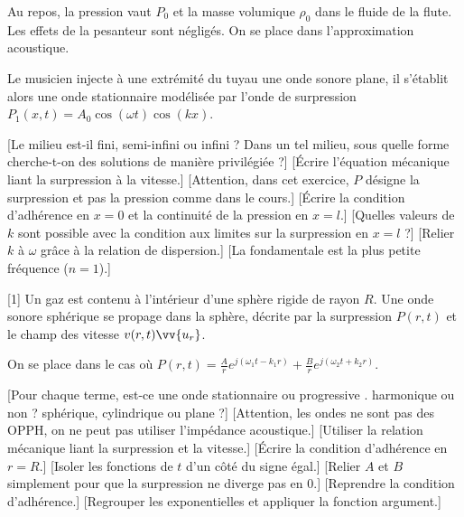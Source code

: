 Au repos, la pression vaut $P_0$ et la masse volumique $\rho_0$ dans le fluide de la flute. Les effets de la pesanteur sont négligés. On se place dans l'approximation acoustique.

Le musicien injecte à une extrémité du tuyau une onde sonore plane, il s'établit alors une onde stationnaire modélisée par l'onde de surpression $P_1(x,t)=A_0\cos(\omega t)\cos(kx)$.
\begin{enumerate}
    [Le milieu est-il fini, semi-infini ou infini ? Dans un tel milieu, sous quelle forme cherche-t-on des solutions de manière privilégiée ?]
    [Écrire l'équation mécanique liant la surpression à la vitesse.]
    [Attention, dans cet exercice, $P$ désigne la surpression et pas la pression comme dans le cours.]
    [Écrire la condition d'adhérence en $x=0$ et la continuité de la pression en $x=l$.]
    [Quelles valeurs de $k$ sont possible avec la condition aux limites sur la surpression en $x=l$ ?]
    [Relier $k$ à $\omega$ grâce à la relation de dispersion.]
    [La fondamentale est la plus petite fréquence ($n=1$).]
\end{enumerate}


[1]
Un gaz est contenu à l'intérieur d'une sphère rigide de rayon $R$. Une onde sonore sphérique se propage dans la sphère, décrite par la surpression $P(r,t)$ et le champ des vitesse $v(r,t)\vv{u_r}$.

On se place dans le cas où $P(r,t)=\frac{A}{r}e^{j(\omega_1t-k_1r)}+\frac{B}{r}e^{j(\omega_2t+k_2r)}$.
\begin{enumerate}
    [Pour chaque terme, est-ce une onde stationnaire ou progressive . harmonique ou non ? sphérique, cylindrique ou plane ?]
    [Attention, les ondes ne sont pas des OPPH, on ne peut pas utiliser l'impédance acoustique.]
    [Utiliser la relation mécanique liant la surpression et la vitesse.]
    [Écrire la condition d'adhérence en $r=R$.]
    [Isoler les fonctions de $t$ d'un côté du signe égal.]
    [Relier $A$ et $B$ simplement pour que la surpression ne diverge pas en 0.]
    [Reprendre la condition d'adhérence.]
    [Regrouper les exponentielles et appliquer la fonction argument.]
\end{enumerate}



